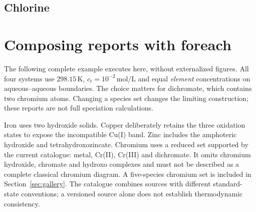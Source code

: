 \documentclass[a4paper,11pt]{ltxdoc}
\begin{document}
\subsection{Chlorine}
\begin{codeexample}[width=11cm]
\end{codeexample}
\section{Composing reports with foreach}\label{sec:report-examples}
The following complete example executes here, without externalized figures.
All four systems use $298.15\,\mathrm{K}$, $c_t=10^{-2}\,\mathrm{mol/L}$ and equal
\emph{element} concentrations on aqueous--aqueous boundaries. The choice matters
for dichromate, which contains two chromium atoms. Changing a species set changes
the limiting construction; these reports are not full speciation calculations.

Iron uses two hydroxide solids. Copper deliberately retains the three oxidation
states to expose the incompatible Cu(I) band. Zinc includes the amphoteric
hydroxide and tetrahydroxozincate. Chromium uses a reduced set supported by the
current catalogue: metal, Cr(II), Cr(III) and dichromate. It omits chromium
hydroxide, chromate and hydroxo complexes and must not be described as a complete
classical chromium diagram. A five-species chromium set is included in
Section~\ref{sec:gallery}.
The catalogue combines sources with different standard-state conventions;
a versioned source alone does not establish thermodynamic consistency.
\end{document}
